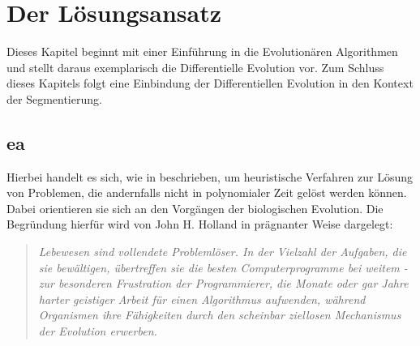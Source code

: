 \chapter{Der Lösungsansatz}
\label{sec:sol}

	Dieses Kapitel beginnt mit einer Einführung in die Evolutionären Algorithmen und stellt daraus exemplarisch die Differentielle Evolution vor. Zum Schluss dieses Kapitels folgt eine Einbindung der Differentiellen Evolution in den Kontext der Segmentierung.

	\section{\gls{ea}}
	\label{sec:evol}
	
		Hierbei handelt es sich, wie in \cite{ea-intro} beschrieben, um heuristische Verfahren zur Lösung von Problemen, die andernfalls nicht in polynomialer Zeit gelöst werden können. Dabei orientieren sie sich an den Vorgängen der biologischen Evolution. Die Begründung hierfür wird von John H. Holland \cite{j-h-holland} in prägnanter Weise dargelegt: 
	
		\begin{quote}
			\textit{Lebewesen sind vollendete Problemlöser. In der Vielzahl der Aufgaben, die sie bewältigen, übertreffen sie die besten Computerprogramme bei weitem - zur besonderen Frustration der Programmierer, die Monate oder gar Jahre harter geistiger Arbeit für einen Algorithmus aufwenden, während Organismen ihre Fähigkeiten durch den scheinbar ziellosen Mechanismus der Evolution erwerben.}
		\end{quote}
	
